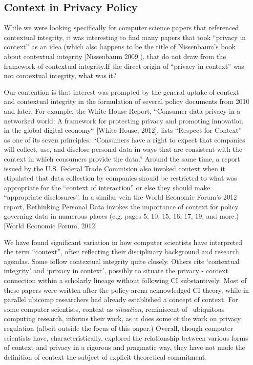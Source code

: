 \documentclass[../thesis.tex]{subfiles}
\begin{document}
\subsection{Context in Privacy Policy}
\label{CI2.3}
  
While we were looking specifically for computer science papers that
referenced contextual integrity, it was interesting to find many papers
that took ``privacy in context'' as
an idea (which also happens to be the title of
Nissenbaum's book about contextual integrity
[Nissenbaum 2009]), that do not draw from the framework of contextual
integrity.If the direct origin of ``privacy in
context'' was not contextual integrity, what was it?


\bigskip

Our contention is that interest was prompted by the general uptake of
context and contextual integrity in the formulation of several policy
documents from 2010 and later. For example, the White House Report,
``Consumer data privacy in a networked world: A
framework for protecting privacy and promoting innovation in the global
digital economy`` [White House, 2012], lists
``Respect for Context'' as one of
its seven principles: ``Consumers have a right to
expect that companies will collect, use, and disclose personal data in
ways that are consistent with the context in which consumers provide
the data.'' Around the same time, a report issued by
the U.S. Federal Trade Commision also invoked context when it
stipulated that data collection by companies should be restricted to
what was appropriate for the ``context of
interaction'' or else they should make
``appropriate disclosures''. In a
similar vein the World Economic Forum's 2012 report,
Rethinking Personal Data invokes the importance of context for policy
governing data in numerous places (e.g. pages 5, 10, 15, 16, 17, 19,
and more.)[World Economic Forum, 2012] 


\bigskip

We have found significant variation in how computer scientists have
interpreted the term ``context'',
often reflecting their disciplinary background and research agendas.
Some follow contextual integrity quite closely. Others cite
{\textquoteleft}contextual integrity' and
{\textquoteleft}privacy in context', possibly to
situate the privacy - context connection within a scholarly lineage
without following CI
substantively.\textbf{\textcolor[rgb]{0.13333334,0.13333334,0.13333334}{
}}\textcolor[rgb]{0.13333334,0.13333334,0.13333334}{Most of these
papers were written after the policy arena acknowledged CI theory,
while in parallel ubicomp researchers had already established a concept
of context. For }some computer scientists, context as
\textit{situation}, reminiscent of \ ubiquitous computing research,
informs their work, as it does some of the work on privacy regulation
(albeit outside the focus of this paper.) Overall, though computer
scientists have, characteristically, explored the relationship between
various forms of context and privacy in a rigorous and pragmatic way,
they have not made the definition of context the subject of explicit
theoretical commitment.
\end{document}
